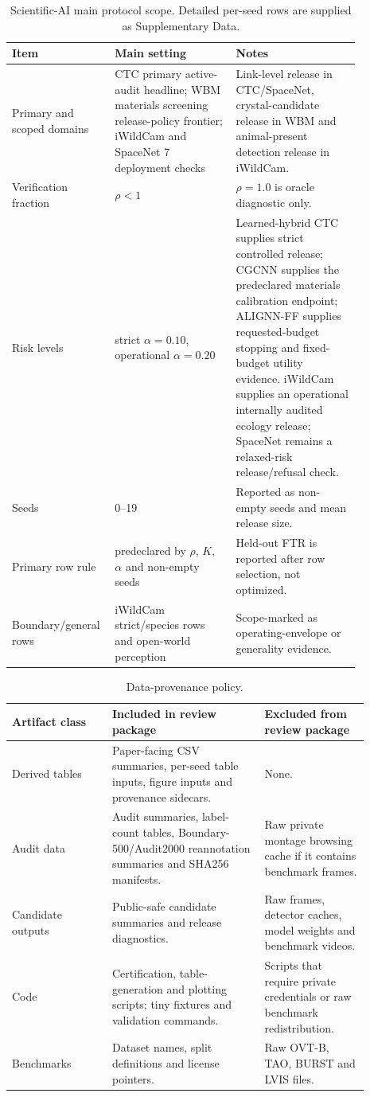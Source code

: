 \documentclass[11pt]{article}
\begin{document}
\begin{table}[h]
\centering
\caption{Scientific-AI main protocol scope. Detailed per-seed rows are supplied as Supplementary Data.}
\small
\begin{tabular}{p{0.20\linewidth}p{0.33\linewidth}p{0.34\linewidth}}
\toprule
Item & Main setting & Notes \\
\midrule
Primary and scoped domains & CTC primary active-audit headline; WBM materials screening release-policy frontier; iWildCam and SpaceNet 7 deployment checks & Link-level release in CTC/SpaceNet, crystal-candidate release in WBM and animal-present detection release in iWildCam. \\
Verification fraction & \(\rho<1\) & \(\rho=1.0\) is oracle diagnostic only. \\
Risk levels & strict \(\alpha=0.10\), operational \(\alpha=0.20\) & Learned-hybrid CTC supplies strict controlled release; CGCNN supplies the predeclared materials calibration endpoint; ALIGNN-FF supplies requested-budget stopping and fixed-budget utility evidence. iWildCam supplies an operational internally audited ecology release; SpaceNet remains a relaxed-risk release/refusal check. \\
Seeds & 0--19 & Reported as non-empty seeds and mean release size. \\
Primary row rule & predeclared by \(\rho\), \(K\), \(\alpha\) and non-empty seeds & Held-out FTR is reported after row selection, not optimized. \\
Boundary/general rows & iWildCam strict/species rows and open-world perception & Scope-marked as operating-envelope or generality evidence. \\
\bottomrule
\end{tabular}
\end{table}

\begin{table}[h]
\centering
\caption{Data-provenance policy.}
\small
\begin{tabular}{p{0.25\linewidth}p{0.38\linewidth}p{0.26\linewidth}}
\toprule
Artifact class & Included in review package & Excluded from review package \\
\midrule
Derived tables & Paper-facing CSV summaries, per-seed table inputs, figure inputs and provenance sidecars. & None. \\
Audit data & Audit summaries, label-count tables, Boundary-500/Audit2000 reannotation summaries and SHA256 manifests. & Raw private montage browsing cache if it contains benchmark frames. \\
Candidate outputs & Public-safe candidate summaries and release diagnostics. & Raw frames, detector caches, model weights and benchmark videos. \\
Code & Certification, table-generation and plotting scripts; tiny fixtures and validation commands. & Scripts that require private credentials or raw benchmark redistribution. \\
Benchmarks & Dataset names, split definitions and license pointers. & Raw OVT-B, TAO, BURST and LVIS files. \\
\bottomrule
\end{tabular}
\end{table}
\end{document}
